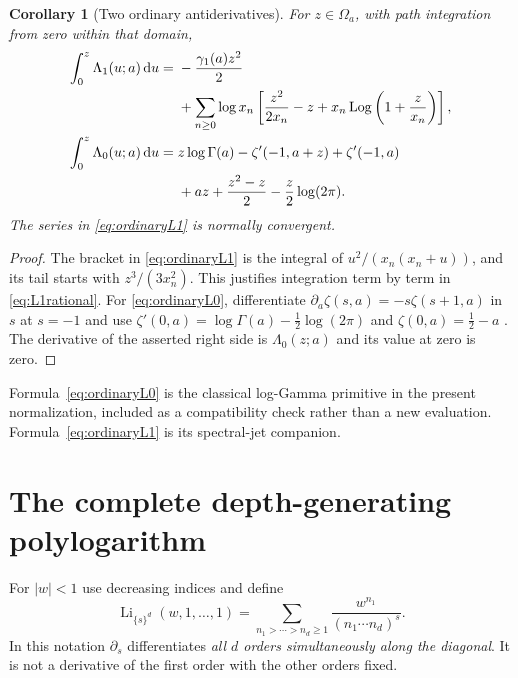 \documentclass[11pt]{article}
\numberwithin{equation}{section}
\newtheorem{corollary}[theorem]{Corollary}
\theoremstyle{definition}\newtheorem{definition}[theorem]{Definition}
\theoremstyle{remark}\newtheorem{remark}[theorem]{Remark}
\DeclareMathOperator{\Li}{Li}
\DeclareMathOperator{\Log}{Log}
\newcommand{\dd}{\,\mathrm d}
\begin{document}
\begin{corollary}[Two ordinary antiderivatives]
\label{cor:ordinary}
For $z\in\Omega_a$, with path integration from zero within that domain,
\begin{align}
 \int_0^z\Lambda_1(u;a)\dd u
 ={}&-\frac{\gamma_1(a)z^2}{2}\notag\\
 &+\sum_{n\ge0}\log x_n\left[
 \frac{z^2}{2x_n}-z+x_n\Log\left(1+\frac z{x_n}\right)\right],
 \label{eq:ordinaryL1}\\
 \int_0^z\Lambda_0(u;a)\dd u
 ={}&z\log\Gamma(a)-\zeta'(-1,a+z)+\zeta'(-1,a)\notag\\
 &+az+\frac{z^2-z}{2}-\frac z2\log(2\pi).
 \label{eq:ordinaryL0}
\end{align}
The series in \eqref{eq:ordinaryL1} is normally convergent.
\end{corollary}
\begin{proof}
The bracket in \eqref{eq:ordinaryL1} is the integral of
$u^2/(x_n(x_n+u))$, and its tail starts with $z^3/(3x_n^2)$.
This justifies integration term by term in \eqref{eq:L1rational}.
For \eqref{eq:ordinaryL0}, differentiate
$\partial_a\zeta(s,a)=-s\zeta(s+1,a)$ in $s$ at $s=-1$ and use
$\zeta'(0,a)=\log\Gamma(a)-\tfrac12\log(2\pi)$ and
$\zeta(0,a)=\tfrac12-a$ \cite{DLMFzeta}. The derivative of the asserted
right side is $\Lambda_0(z;a)$ and its value at zero is zero.
\end{proof}
Formula~\eqref{eq:ordinaryL0} is the classical log-Gamma primitive in the
present normalization, included as a compatibility check rather than a
new evaluation. Formula~\eqref{eq:ordinaryL1} is its spectral-jet companion.

\section{The complete depth-generating polylogarithm}
\label{sec:polygen}
For $|w|<1$ use decreasing indices and define
\begin{equation}
 \Li_{\{s\}^d}(w,1,\ldots,1)
 =\sum_{n_1>\cdots>n_d\ge1}
       \frac{w^{n_1}}{(n_1\cdots n_d)^s}.
 \label{eq:multipleLi}
\end{equation}
In this notation $\partial_s$ differentiates \emph{all $d$ orders
simultaneously along the diagonal}. It is not a derivative of the first
order with the other orders fixed.
\end{document}

